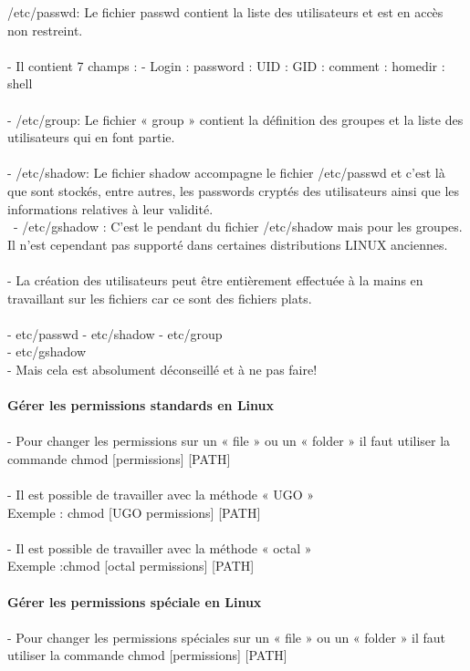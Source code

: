 \documentclass[10pt,a4paper]{article}
\begin{document}
/etc/passwd: Le fichier passwd contient la liste des utilisateurs et est en accès non restreint. \\\\
- Il contient 7 champs : - Login : password : UID : GID : comment : homedir : shell\\\\
- /etc/group: Le fichier « group » contient la définition des groupes et la liste des utilisateurs qui en font partie. \\\\
- /etc/shadow: Le fichier shadow accompagne le fichier /etc/passwd et c’est là que sont stockés, entre autres, les passwords cryptés des utilisateurs ainsi que les informations relatives à leur validité. \\\
- /etc/gshadow : C’est le pendant du fichier /etc/shadow mais pour les groupes. Il n’est cependant pas supporté dans certaines distributions LINUX anciennes.\\\\
- La création des utilisateurs peut être entièrement effectuée à la mains en travaillant sur les fichiers car ce sont des fichiers plats. \\\\
- etc/passwd - etc/shadow - etc/group \\
- etc/gshadow \\
- Mais cela est absolument déconseillé et à ne pas faire!\\\\
{\large\textbf{Gérer les permissions standards en Linux  }}\\\\
- Pour changer les permissions sur un « file » ou un « folder » il faut utiliser la commande chmod [permissions] [PATH]  \\\\
- Il est possible de travailler avec la méthode « UGO »\\ 
Exemple : chmod [UGO permissions] [PATH] \\\\
- Il est possible de travailler avec la méthode « octal » \\
Exemple :chmod [octal permissions] [PATH] \\\\
{\large\textbf{Gérer les permissions spéciale en Linux }}\\\\
- Pour changer les permissions spéciales sur un « file » ou un « folder » il faut utiliser la commande chmod [permissions] [PATH] \\\\
\end{document}
